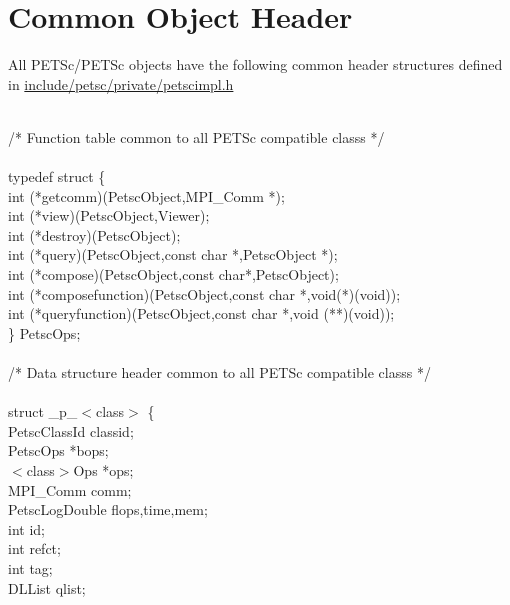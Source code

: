 \documentclass[twoside,12pt]{../sty/report_petsc}
\begin{document}
\section{Common Object Header}

All PETSc/PETSc objects have the following common header structures
defined in \href{http://www.mcs.anl.gov/petsc/petsc-master/include/petsc/private/petscimpl.h.html}{include/petsc/private/petscimpl.h}

\begin{tabbing}
\\
/* Function table common to all PETSc compatible classs */\\
\\
typedef struct \{ \\
   int (*getcomm)(PetscObject,MPI\_Comm *);\\
   int (*view)(PetscObject,Viewer);\\
   int (*destroy)(PetscObject);\\
   int (*query)(PetscObject,const char *,PetscObject *);\\
   int (*compose)(PetscObject,const char*,PetscObject);\\
   int (*composefunction)(PetscObject,const char *,void(*)(void));\\
   int (*queryfunction)(PetscObject,const char *,void (**)(void));\\
\} PetscOps;\\
\\
/* Data structure header common to all PETSc compatible classs */\\
\\
struct \_p\_$<$class$>$ \{\\
  PetscClassId     classid;                                  \\
  PetscOps         *bops;                                   \\
  $<$class$>$Ops   *ops;                                    \\
  MPI\_Comm         comm;                                    \\
  PetscLogDouble  flops,time,mem;                          \\
  int              id;                                      \\
  int              refct;                                   \\
  int              tag;                                     \\
  DLList           qlist;                                   \\

\end{tabbing}
\end{document}
